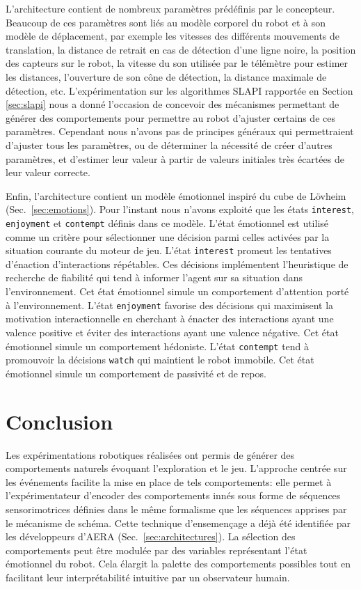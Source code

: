 L'architecture contient de nombreux paramètres prédéfinis par le concepteur. 
Beaucoup de ces paramètres sont liés au modèle corporel du robot et à son modèle de déplacement, par exemple les vitesses des différents mouvements de translation, la distance de retrait en cas de détection d'une ligne noire, la position des capteurs sur le robot, la vitesse du son utilisée par le télémètre pour estimer les distances, l'ouverture de son cône de détection, la distance maximale de détection, etc. 
L'expérimentation sur les algorithmes SLAPI rapportée en Section \ref{sec:slapi} nous a donné l'occasion de concevoir des mécanismes permettant de générer des comportements pour permettre au robot d'ajuster certains de ces paramètres. 
Cependant nous n'avons pas de principes généraux qui permettraient d'ajuster tous les paramètres, ou de déterminer la nécessité de créer d'autres paramètres, et d'estimer leur valeur à partir de valeurs initiales très écartées de leur valeur correcte.


Enfin, l'architecture contient un modèle émotionnel inspiré du cube de Lövheim (Sec.~\ref{sec:emotions}). 
Pour l'instant nous n'avons exploité que les états \texttt{interest}, \texttt{enjoyment} et \texttt{contempt} définis dans ce modèle. 
L'état émotionnel est utilisé comme un critère pour sélectionner une décision parmi celles activées par la situation courante du moteur de jeu. 
L'état \texttt{interest} promeut les tentatives d'énaction d'interactions répétables. 
Ces décisions implémentent l'heuristique de recherche de fiabilité qui tend à informer l'agent sur sa situation dans l'environnement. 
Cet état émotionnel simule un comportement d'attention porté à l'environnement. 
L'état \texttt{enjoyment} favorise des décisions qui maximisent la motivation interactionnelle en cherchant à énacter des interactions ayant une valence positive et éviter des interactions ayant une valence négative.
Cet état émotionnel simule un comportement hédoniste.  
L'état \texttt{contempt} tend à promouvoir la décisions \texttt{watch} qui maintient le robot immobile. 
Cet état émotionnel simule un comportement de passivité et de repos. 



\section{Conclusion}

\noindent
Les expérimentations robotiques réalisées ont permis de générer des comportements naturels évoquant l'exploration et le jeu.
L'approche centrée sur les événements facilite la mise en place de tels comportements:
elle permet à l'expérimentateur d'encoder des comportements innés sous forme de séquences sensorimotrices définies dans le même formalisme que les séquences apprises par le mécanisme de schéma. 
Cette technique d'ensemençage a déjà été identifiée par les développeurs d'AERA (Sec.~\ref{sec:architectures}). 
La sélection des comportements peut être modulée par des variables représentant l'état émotionnel du robot.
Cela élargit la palette des comportements possibles tout en facilitant leur  interprétabilité  intuitive par un observateur humain.


